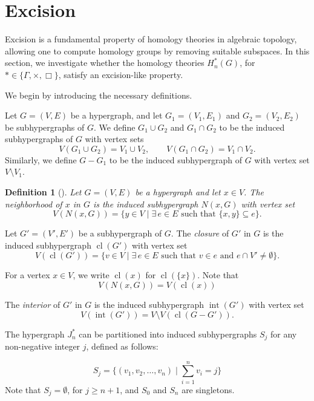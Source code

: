 \documentclass[10pt,a4paper]{amsart}
\newtheorem{Def}[subsection]{Definition}
\newcommand{\cl}{\operatorname{cl}}
\renewcommand{\int}{\operatorname{int}}
\begin{document}
\section{Excision}\label{sec:excision}

Excision is a fundamental property of homology theories in algebraic topology, allowing one to compute homology groups by removing suitable subspaces. In this section, we investigate whether the homology theories $H_n^*(G)$, for $* \in \{\Gamma, \times, \Box\}$, satisfy an excision-like property.

We begin by introducing the necessary definitions.

Let $G = (V,E)$ be a hypergraph, and let $G_1 = (V_1,E_1)$ and $G_2 = (V_2,E_2)$ be subhypergraphs of $G$. We define $G_1 \cup G_2$ and $G_1 \cap G_2$ to be the induced subhypergraphs of $G$ with vertex sets
\[
V(G_1 \cup G_2) = V_1 \cup V_2, \qquad V(G_1 \cap G_2) = V_1 \cap V_2.
\]
Similarly, we define $G - G_1$ to be the induced subhypergraph of $G$ with vertex set $V \setminus V_1$.

\medskip

\begin{Def}[{\cite{HG_Bretto}}]\label{def:neighborhood}
Let $G = (V,E)$ be a hypergraph and let $x \in V$. The \emph{neighborhood} of $x$ in $G$ is the induced subhypergraph $N(x,G)$ with vertex set
\[
V(N(x,G)) = \{ y \in V \mid \exists\, e \in E \text{ such that } \{x,y\} \subseteq e \}.
\]
\end{Def}

\medskip

Let $G' = (V',E')$ be a subhypergraph of $G$. The \emph{closure} of $G'$ in $G$ is the induced subhypergraph $\cl(G')$ with vertex set
\[
V(\cl(G')) = \{ v \in V \mid \exists\, e \in E \text{ such that } v \in e \text{ and } e \cap V' \neq \emptyset \}.
\]

For a vertex $x \in V$, we write $\cl(x)$ for $\cl(\{x\})$. Note that
\[
V(N(x,G)) = V(\cl(x))
\]

\medskip

The \emph{interior} of $G'$ in $G$ is the induced subhypergraph $\int(G')$ with vertex set
\[
V(\int(G')) = V \setminus V(\cl(G - G')).
\]

\medskip

The hypergraph $J_n^*$ can be partitioned into induced subhypergraphs $S_j$ for any non-negative integer $j$, defined as follows:

\[
S_j = \{ (v_1, v_2, \ldots, v_n) \mid \sum_{i=1}^n v_i = j \}
\]
Note that $S_j=\emptyset$, for $j\geq n+1$, and
$S_0$ and $S_n$ are singletons.
\end{document}
